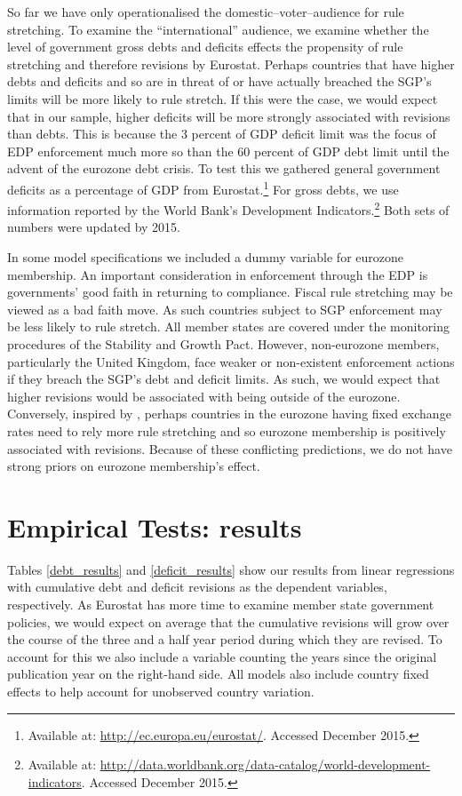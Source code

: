\documentclass[]{article}
\begin{document}
So far we have only operationalised the domestic--voter--audience for rule stretching. To examine the ``international'' audience, we examine whether the level of government gross debts and deficits effects the propensity of rule stretching and therefore revisions by Eurostat. Perhaps countries that have higher debts and deficits and so are in threat of or have actually breached the SGP's limits will be more likely to rule stretch. If this were the case, we would expect that in our sample, higher deficits will be more strongly associated with revisions than debts. This is because the 3 percent of GDP deficit limit was the focus of EDP enforcement much more so than the 60 percent of GDP debt limit until the advent of the eurozone debt crisis. To test this we gathered general government deficits as a percentage of GDP from Eurostat.\footnote{Available at: \url{http://ec.europa.eu/eurostat/}. Accessed December 2015.} For gross debts, we use information reported by the World Bank's Development Indicators.\footnote{Available at: \url{http://data.worldbank.org/data-catalog/world-development-indicators}. Accessed December 2015.} Both sets of numbers were updated by 2015.

In some model specifications we included a dummy variable for eurozone membership. An important consideration in enforcement through the EDP is governments' good faith in returning to compliance. Fiscal rule stretching may be viewed as a bad faith move. As such countries subject to SGP enforcement may be less likely to rule stretch. All member states are covered under the monitoring procedures of the Stability and Growth Pact. However, non-eurozone members, particularly the United Kingdom, face weaker or non-existent enforcement actions if they breach the SGP's debt and deficit limits. As such, we would expect that higher revisions would be associated with being outside of the eurozone. Conversely, inspired by \cite{clark2003}, perhaps countries in the eurozone having fixed exchange rates need to rely more rule stretching and so eurozone membership is positively associated with revisions. Because of these conflicting predictions, we do not have strong priors on eurozone membership's effect.

\section{Empirical Tests: results}

Tables \ref{debt_results} and \ref{deficit_results} show our results from linear regressions with cumulative debt and deficit revisions as the dependent variables, respectively. As Eurostat has more time to examine member state government policies, we would expect on average that the cumulative revisions will grow over the course of the three and a half year period during which they are revised. To account for this we also include a variable counting the years since the original publication year on the right-hand side. All models also include country fixed effects to help account for unobserved country variation.
\end{document}
